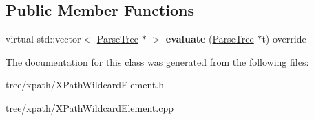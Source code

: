 \subsection*{Public Member Functions}
\begin{DoxyCompactItemize}
\item 
\mbox{\label{classantlr4_1_1tree_1_1xpath_1_1XPathWildcardElement_acec3123782a4942af97a15de6ebf2e50}} 
virtual std\+::vector$<$ \hyperlink{classantlr4_1_1tree_1_1ParseTree}{Parse\+Tree} $\ast$ $>$ {\bfseries evaluate} (\hyperlink{classantlr4_1_1tree_1_1ParseTree}{Parse\+Tree} $\ast$t) override
\end{DoxyCompactItemize}


The documentation for this class was generated from the following files\+:\begin{DoxyCompactItemize}
\item 
tree/xpath/X\+Path\+Wildcard\+Element.\+h\item 
tree/xpath/X\+Path\+Wildcard\+Element.\+cpp\end{DoxyCompactItemize}
